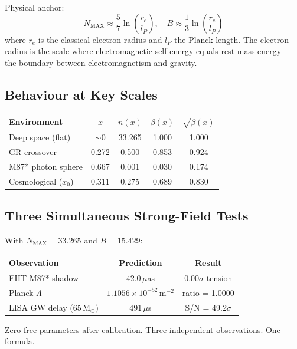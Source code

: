 \documentclass[12pt]{article}
\begin{document}
Physical anchor:
\begin{equation}
N_\text{MAX} \approx \frac{5}{7}\ln\!\left(\frac{r_e}{l_P}\right), \quad
B \approx \frac{1}{3}\ln\!\left(\frac{r_e}{l_P}\right)
\end{equation}
where $r_e$ is the classical electron radius and $l_P$ the Planck length.
The electron radius is the scale where electromagnetic self-energy equals
rest mass energy --- the boundary between electromagnetism and gravity.

\subsection{Behaviour at Key Scales}

\begin{center}
\begin{tabular}{lcccc}
\toprule
Environment & $x$ & $n(x)$ & $\beta(x)$ & $\sqrt{\beta(x)}$ \\
\midrule
Deep space (flat) & $\sim 0$ & 33.265 & 1.000 & 1.000 \\
GR crossover & 0.272 & 0.500 & 0.853 & 0.924 \\
M87* photon sphere & 0.667 & 0.001 & 0.030 & 0.174 \\
Cosmological ($x_0$) & 0.311 & 0.275 & 0.689 & 0.830 \\
\bottomrule
\end{tabular}
\end{center}

\subsection{Three Simultaneous Strong-Field Tests}

With $N_\text{MAX} = 33.265$ and $B = 15.429$:

\begin{center}
\begin{tabular}{lcc}
\toprule
Observation & Prediction & Result \\
\midrule
EHT M87* shadow & 42.0\,$\mu$as & $0.00\sigma$ tension \\
Planck $\Lambda$ & $1.1056 \times 10^{-52}$\,m$^{-2}$ & ratio = 1.0000 \\
LISA GW delay (65\,M$_\odot$) & 491\,$\mu$s & S/N = 49.2$\sigma$ \\
\bottomrule
\end{tabular}
\end{center}

Zero free parameters after calibration. Three independent observations. One formula.
\end{document}
